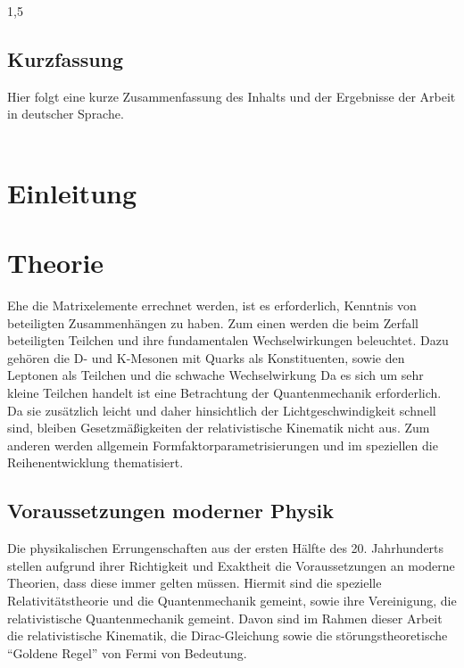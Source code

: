 \documentclass[11pt,a4paper,twoside]{report}
\begin{document}
\begin{spacing}{1,5}

\thispagestyle{empty}
\section*{Kurzfassung}
Hier folgt eine kurze Zusammenfassung des Inhalts und der Ergebnisse der Arbeit in deutscher Sprache.\\
\ \\

\newpage


\tableofcontents\newpage
{}
\listoffigures\newpage
{}
\listoftables\newpage

\setcounter{page}{0}

\chapter{Einleitung}


\chapter{Theorie}
Ehe die Matrixelemente errechnet werden, ist es erforderlich, Kenntnis von beteiligten Zusammenhängen zu haben. Zum einen werden die beim Zerfall beteiligten
Teilchen und ihre fundamentalen Wechselwirkungen beleuchtet. Dazu gehören die D- und K-Mesonen mit Quarks als Konstituenten, sowie den Leptonen als Teilchen
und die schwache Wechselwirkung 
Da es sich um sehr kleine Teilchen handelt ist eine Betrachtung der Quantenmechanik erforderlich. 
Da sie zusätzlich leicht und daher hinsichtlich der Lichtgeschwindigkeit schnell sind, bleiben Gesetzmäßigkeiten der relativistische Kinematik nicht aus.
Zum anderen werden allgemein Formfaktorparametrisierungen und im speziellen die Reihenentwicklung thematisiert.
\section{Voraussetzungen moderner Physik}
Die physikalischen Errungenschaften aus der ersten Hälfte des 20. Jahrhunderts stellen aufgrund ihrer Richtigkeit und Exaktheit die Voraussetzungen an moderne 
Theorien, dass diese immer gelten müssen. Hiermit sind die spezielle Relativitätstheorie und die Quantenmechanik gemeint, sowie ihre Vereinigung, die relativistische
Quantenmechanik gemeint. Davon sind im Rahmen dieser Arbeit die relativistische Kinematik, die Dirac-Gleichung sowie die störungstheoretische ``Goldene Regel'' von Fermi
von Bedeutung.


\end{spacing}
\end{document}

